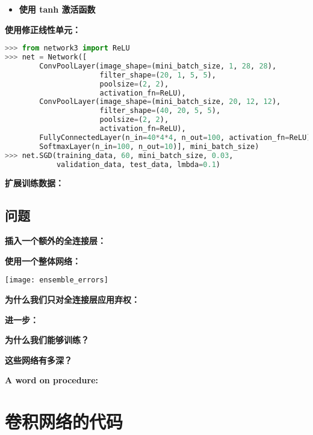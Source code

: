\begin{itemize}
\item \textbf{使用 tanh 激活函数}
\end{itemize}

\textbf{使用修正线性单元：}

\begin{lstlisting}[language=Python]
>>> from network3 import ReLU
>>> net = Network([
        ConvPoolLayer(image_shape=(mini_batch_size, 1, 28, 28), 
                      filter_shape=(20, 1, 5, 5), 
                      poolsize=(2, 2), 
                      activation_fn=ReLU),
        ConvPoolLayer(image_shape=(mini_batch_size, 20, 12, 12), 
                      filter_shape=(40, 20, 5, 5), 
                      poolsize=(2, 2), 
                      activation_fn=ReLU),
        FullyConnectedLayer(n_in=40*4*4, n_out=100, activation_fn=ReLU),
        SoftmaxLayer(n_in=100, n_out=10)], mini_batch_size)
>>> net.SGD(training_data, 60, mini_batch_size, 0.03, 
            validation_data, test_data, lmbda=0.1)
\end{lstlisting}

\textbf{扩展训练数据：}

\subsection*{问题}

\textbf{插入一个额外的全连接层：}

\textbf{使用一个整体网络：}

\begin{center}
  \texttt{[image: ensemble\_errors]}
\end{center}

\textbf{为什么我们只对全连接层应用弃权：}

\textbf{进一步：}

\textbf{为什么我们能够训练？}

\textbf{这些网络有多深？}

\textbf{A word on procedure:}

\section{卷积网络的代码}
\label{sec:the_code_for_our_convolutional_networks}

